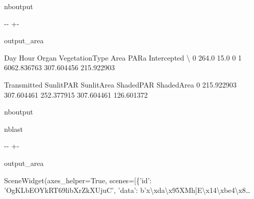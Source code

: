 \documentclass[letterpaper,10pt,english]{sphinxmanual}
\begin{document}
\begin{sphinxuseclass}{nboutput}
{

\kern-\sphinxverbatimsmallskipamount\kern-\baselineskip
\kern+\FrameHeightAdjust\kern-\fboxrule
\vspace{\nbsphinxcodecellspacing}

\begin{sphinxuseclass}{output_area}
\begin{sphinxuseclass}{}


\begin{sphinxVerbatim}[commandchars=\\\{\}]
     Day  Hour  Organ  VegetationType         Area        PARa  Intercepted  \textbackslash{}
0  264.0  15.0      0               1  6062.836763  307.604456   215.922903

   Transmitted   SunlitPAR  SunlitArea   ShadedPAR  ShadedArea
0   215.922903  307.604461  252.377915  307.604461  126.601372
\end{sphinxVerbatim}



\end{sphinxuseclass}
\end{sphinxuseclass}
}

\end{sphinxuseclass}
\begin{sphinxuseclass}{nboutput}
\begin{sphinxuseclass}{nblast}
{

\kern-\sphinxverbatimsmallskipamount\kern-\baselineskip
\kern+\FrameHeightAdjust\kern-\fboxrule
\vspace{\nbsphinxcodecellspacing}

\begin{sphinxuseclass}{output_area}
\begin{sphinxuseclass}{}


\begin{sphinxVerbatim}[commandchars=\\\{\}]
\llap{\color{nbsphinxout}[16]:\,\hspace{\fboxrule}\hspace{\fboxsep}}SceneWidget(axes\_helper=True, scenes=[\{'id': 'OgKLbEOYkRT69libXrZkXUjuC', 'data': b'x\textbackslash{}xda\textbackslash{}x95XMh]E\textbackslash{}x14\textbackslash{}xbe4\textbackslash{}x8…
\end{sphinxVerbatim}



\end{sphinxuseclass}
\end{sphinxuseclass}
}

\end{sphinxuseclass}
\end{sphinxuseclass}
\end{document}
